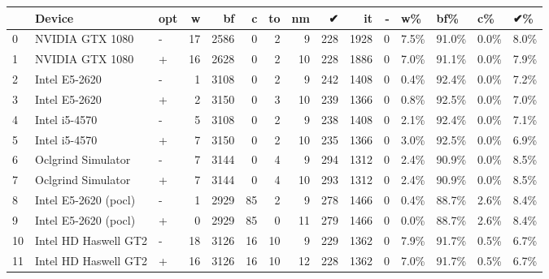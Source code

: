 \begin{tabular}{lllrrrrrrrrllll}
\toprule
{} &                Device & opt &   w &    bf &   c &  to &  nm &    ✔ &    it &  - &    w\% &    bf\% &    c\% &    ✔\% \\
\midrule
0  &       NVIDIA GTX 1080 &   - &  17 &  2586 &   0 &   2 &   9 &  228 &  1928 &  0 &  7.5\% &  91.0\% &  0.0\% &  8.0\% \\
1  &       NVIDIA GTX 1080 &   + &  16 &  2628 &   0 &   2 &  10 &  228 &  1886 &  0 &  7.0\% &  91.1\% &  0.0\% &  7.9\% \\
2  &         Intel E5-2620 &   - &   1 &  3108 &   0 &   2 &   9 &  242 &  1408 &  0 &  0.4\% &  92.4\% &  0.0\% &  7.2\% \\
3  &         Intel E5-2620 &   + &   2 &  3150 &   0 &   3 &  10 &  239 &  1366 &  0 &  0.8\% &  92.5\% &  0.0\% &  7.0\% \\
4  &         Intel i5-4570 &   - &   5 &  3108 &   0 &   2 &   9 &  238 &  1408 &  0 &  2.1\% &  92.4\% &  0.0\% &  7.1\% \\
5  &         Intel i5-4570 &   + &   7 &  3150 &   0 &   2 &  10 &  235 &  1366 &  0 &  3.0\% &  92.5\% &  0.0\% &  6.9\% \\
6  &    Oclgrind Simulator &   - &   7 &  3144 &   0 &   4 &   9 &  294 &  1312 &  0 &  2.4\% &  90.9\% &  0.0\% &  8.5\% \\
7  &    Oclgrind Simulator &   + &   7 &  3144 &   0 &   4 &  10 &  293 &  1312 &  0 &  2.4\% &  90.9\% &  0.0\% &  8.5\% \\
8  &  Intel E5-2620 (pocl) &   - &   1 &  2929 &  85 &   2 &   9 &  278 &  1466 &  0 &  0.4\% &  88.7\% &  2.6\% &  8.4\% \\
9  &  Intel E5-2620 (pocl) &   + &   0 &  2929 &  85 &   0 &  11 &  279 &  1466 &  0 &  0.0\% &  88.7\% &  2.6\% &  8.4\% \\
10 &  Intel HD Haswell GT2 &   - &  18 &  3126 &  16 &  10 &   9 &  229 &  1362 &  0 &  7.9\% &  91.7\% &  0.5\% &  6.7\% \\
11 &  Intel HD Haswell GT2 &   + &  16 &  3126 &  16 &  10 &  12 &  228 &  1362 &  0 &  7.0\% &  91.7\% &  0.5\% &  6.7\% \\
\bottomrule
\end{tabular}
